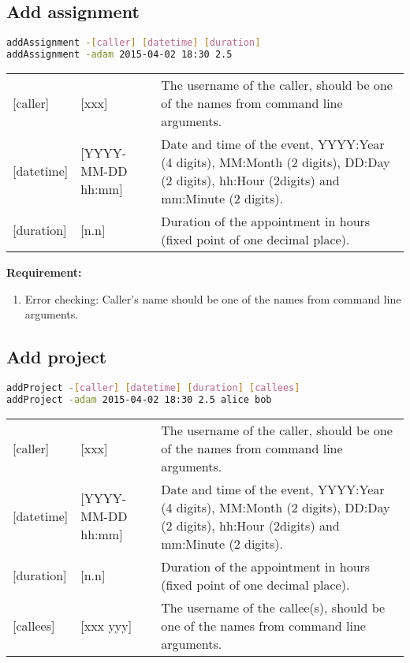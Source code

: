 \documentclass[12pt,a4paper]{report}
\begin{document}
\subsection{Add assignment}
\begin{lstlisting}[language=bash,basicstyle=\ttfamily,keywordstyle=\bfseries]
addAssignment -[caller] [datetime] [duration]
addAssignment -adam 2015-04-02 18:30 2.5
\end{lstlisting}

\begin{table}[h]
\begin{tabular}{lll}
{[}caller{]} & {[}xxx{]} & The username of the caller, should be one of the names from command line arguments. \\
{[}datetime{]} & {[}YYYY-MM-DD hh:mm{]} & \parbox[t]{15cm}{Date and time of the event, YYYY:Year (4 digits), MM:Month (2 digits), DD:Day (2 digits), hh:Hour (2digits) and mm:Minute (2 digits).} \\
{[}duration{]}  & {[}n.n{]} & Duration of the appointment in hours (fixed point of one decimal place).
\end{tabular}
\end{table}

\textbf{Requirement:}
\begin{enumerate}
\item Error checking: Caller's name should be one of the names from command line arguments.
\end{enumerate}

\subsection{Add project}
\begin{lstlisting}[language=bash,basicstyle=\ttfamily,keywordstyle=\bfseries]
addProject -[caller] [datetime] [duration] [callees]
addProject -adam 2015-04-02 18:30 2.5 alice bob
\end{lstlisting}

\begin{table}[h]
\begin{tabular}{lll}
{[}caller{]} & {[}xxx{]} & The username of the caller, should be one of the names from command line arguments. \\
{[}datetime{]} & {[}YYYY-MM-DD hh:mm{]} & \parbox[t]{15cm}{Date and time of the event, YYYY:Year (4 digits), MM:Month (2 digits), DD:Day (2 digits), hh:Hour (2digits) and mm:Minute (2 digits).} \\
{[}duration{]}  & {[}n.n{]} & Duration of the appointment in hours (fixed point of one decimal place). \\
{[}callees{]}  & {[}xxx yyy{]} & The username of the callee(s), should be one of the names from command line arguments.
\end{tabular}
\end{table}
\end{document}
